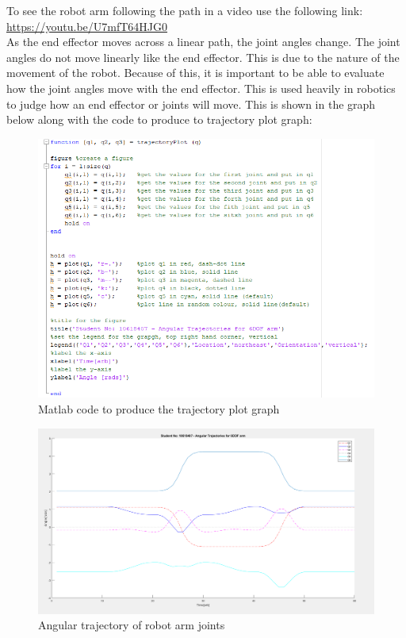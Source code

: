 \documentclass [11pt]{report}
\begin{document}
To see the robot arm following the path in a video use the following link: \href{https://youtu.be/U7mfT64HJG0}{https://youtu.be/U7mfT64HJG0}\\

As the end effector moves across a linear path, the joint angles change. The joint angles do not move linearly like the end effector. This is due to the nature of the movement of the robot. Because of this, it is important to be able to evaluate how the joint angles move with the end effector. This is used heavily in robotics to judge how an end effector or joints will move. This is shown in the graph below along with the code to produce to trajectory plot graph:

\begin{figure}[H]
\centerline{\includegraphics[width=12cm]{trajectoryPlotCode.png}}
\caption{Matlab code to produce the trajectory plot graph}
\label{fig}
\end{figure} 

\begin{figure}[H]
\centerline{\includegraphics[width=20cm]{trajectoryPlot.png}}
\caption{Angular trajectory of robot arm joints }
\label{fig}
\end{figure} 
\end{document}
